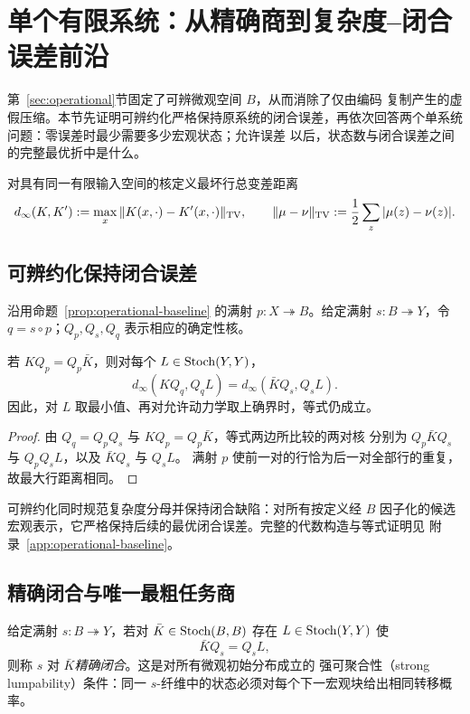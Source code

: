 \section{单个有限系统：从精确商到复杂度--闭合误差前沿}
\label{sec:closure}

第~\ref{sec:operational}节固定了可辨微观空间 $B$，从而消除了仅由编码
复制产生的虚假压缩。本节先证明可辨约化严格保持原系统的闭合误差，再依次回答两个单系统问题：零误差时最少需要多少宏观状态；允许误差
以后，状态数与闭合误差之间的完整最优折中是什么。

对具有同一有限输入空间的核定义最坏行总变差距离
\[
d_\infty(K,K'):=\max_x\|K(x,\cdot)-K'(x,\cdot)\|_{\operatorname{TV}},
\qquad
\|\mu-\nu\|_{\operatorname{TV}}:=\frac12\sum_z|\mu(z)-\nu(z)|.
\]

\subsection{可辨约化保持闭合误差}

沿用命题~\ref{prop:operational-baseline} 的满射
$p:X\twoheadrightarrow B$。给定满射 $s:B\twoheadrightarrow Y$，令
$q=s\circ p$；$Q_p,Q_s,Q_q$ 表示相应的确定性核。

\begin{proposition}[约化前后闭合缺陷相同]
\label{prop:operational-defect-invariance}
若 $KQ_p=Q_p\bar K$，则对每个 $L\in\operatorname{Stoch}(Y,Y)$，
\begin{equation}
 d_\infty(KQ_q,Q_qL)
 =d_\infty(\bar KQ_s,Q_sL).
 \label{eq:operational-defect-equality}
\end{equation}
因此，对 $L$ 取最小值、再对允许动力学取上确界时，等式仍成立。
\end{proposition}

\begin{proof}
由 $Q_q=Q_pQ_s$ 与 $KQ_p=Q_p\bar K$，等式两边所比较的两对核
分别为 $Q_p\bar KQ_s$ 与 $Q_pQ_sL$，以及 $\bar KQ_s$ 与 $Q_sL$。
满射 $p$ 使前一对的行恰为后一对全部行的重复，故最大行距离相同。
\end{proof}

可辨约化同时规范复杂度分母并保持闭合缺陷：对所有按定义经 $B$ 因子化的候选
宏观表示，它严格保持后续的最优闭合误差。完整的代数构造与等式证明见
附录~\ref{app:operational-baseline}。

\subsection{精确闭合与唯一最粗任务商}

给定满射 $s:B\twoheadrightarrow Y$，若对
$\bar K\in\operatorname{Stoch}(B,B)$ 存在 $L\in\operatorname{Stoch}(Y,Y)$ 使
\begin{equation}
 \bar KQ_s=Q_sL,
 \label{eq:exact-closure}
\end{equation}
则称 $s$ 对 $\bar K$\emph{精确闭合}。这是对所有微观初始分布成立的
强可聚合性（strong lumpability）条件\citep{KemenySnell1976,Buchholz1994}：同一
$s$-纤维中的状态必须对每个下一宏观块给出相同转移概率。

